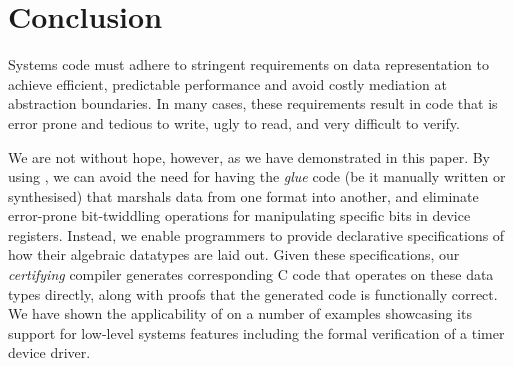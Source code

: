 \section{Conclusion}{\label{sec:conclusion}}

Systems code must adhere to stringent requirements on data
representation to achieve efficient, predictable performance and avoid
costly mediation at abstraction boundaries. In many cases, these
requirements result in code that is error prone and tedious to write,
ugly to read, and very difficult to verify.

We are not without hope, however, as we have demonstrated in this
paper. By using \Dargent, we can avoid the need for having the
\emph{glue} code (be it manually written or synthesised) that marshals
data from one format into another, and eliminate error-prone
bit-twiddling operations for manipulating specific bits in device
registers. Instead, we enable programmers to provide declarative
specifications of how their algebraic datatypes are laid out. Given
these specifications, our \emph{certifying} compiler generates
corresponding C code that operates on these data types directly,
 along with proofs that the generated code is
functionally correct. We have shown the applicability of \dargent on a
number of examples showcasing its support for low-level systems
features including the formal verification of a timer device driver.

